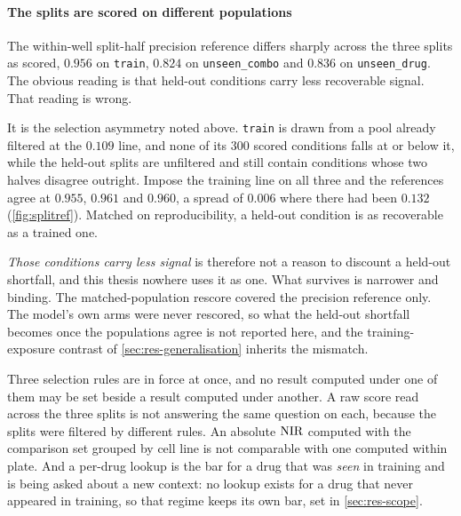 \paragraph{The splits are scored on different populations} The within-well
split-half precision reference differs sharply across the three splits as
scored, $0.956$ on \texttt{train}, $0.824$ on \texttt{unseen\_combo} and $0.836$
on \texttt{unseen\_drug}. The obvious reading is that held-out conditions carry
less recoverable signal. That reading is wrong.

It is the selection asymmetry noted above. \texttt{train} is drawn from a pool
already filtered at the $0.109$ line, and none of its $300$ scored conditions
falls at or below it, while the held-out splits are unfiltered and still contain
conditions whose two halves disagree outright. Impose the training line on all
three and the references agree at $0.955$, $0.961$ and $0.960$, a spread of
$0.006$ where there had been $0.132$ (\cref{fig:splitref}). Matched on
reproducibility, a held-out condition is as recoverable as a trained one.



\emph{Those conditions carry less signal} is therefore not a reason to discount
a held-out shortfall, and this thesis nowhere uses it as one. What survives is
narrower and binding. The matched-population rescore covered the precision
reference only. The model's own arms were never rescored, so what the held-out
shortfall becomes once the populations agree is not reported here, and the
training-exposure contrast of \cref{sec:res-generalisation} inherits the
mismatch.

%
\begin{scopelimit}
Three selection rules are in force at once, and no result computed under one of
them may be set beside a result computed under another. A raw score read across
the three splits is not answering the same question on each, because the splits
were filtered by different rules. An absolute $\textrm{NIR}$ computed with the
comparison set grouped by cell line is not comparable with one computed within
plate. And a per-drug lookup is the bar for a drug that was \emph{seen} in
training and is being asked about a new context: no lookup exists for a drug
that never appeared in training, so that regime keeps its own bar, set in
\cref{sec:res-scope}.
\end{scopelimit}

